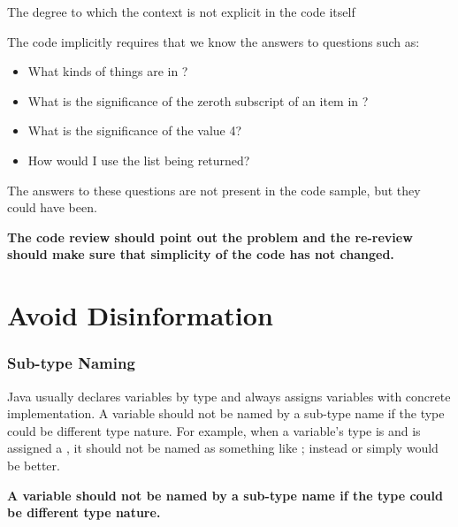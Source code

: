 \begin{definition}
The degree to which the context is not explicit in the code itself
\end{definition}

The code implicitly requires that we know the answers to questions such as:

\begin{itemize}
    \item What kinds of things are in ?
    \item What is the significance of the zeroth subscript of an item in ?
    \item What is the significance of the value 4?
    \item How would I use the list being returned?
\end{itemize}

The answers to these questions are not present in the code sample, but they could have been.

\begin{marker}
\textbf{The code review should point out the problem and the re-review should make sure that simplicity of the code has not changed.}
\end{marker}

\section{Avoid Disinformation}

\subsubsection{Sub-type Naming}

Java usually declares variables by type and always assigns variables with concrete implementation. A variable should not be named by a sub-type name if the type could be different type nature. For example, when a variable's type is  and is assigned a , it should not be named as something like ; instead  or simply  would be better.

\begin{marker}
\textbf{A variable should not be named by a sub-type name if the type could be different type nature.}
\end{marker}

